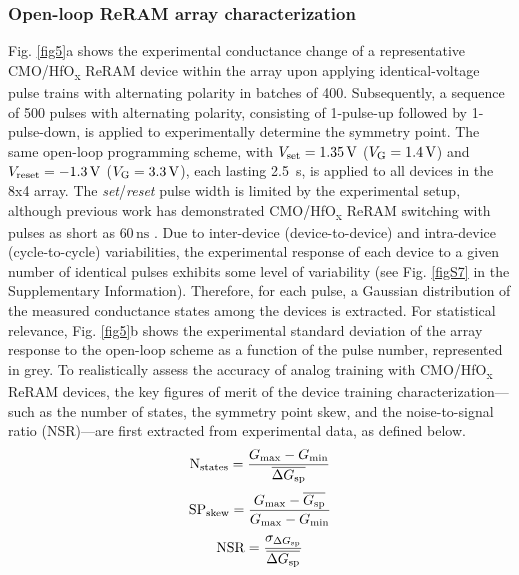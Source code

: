 \subsubsection{Open-loop ReRAM array characterization}\label{openloop_characterization}
Fig. \ref{fig5}a shows the experimental conductance change of a representative CMO/HfO\textsubscript{x} ReRAM device within the array upon applying identical-voltage pulse trains with alternating polarity in batches of 400. Subsequently, a sequence of 500 pulses with alternating polarity, consisting of 1-pulse-up followed by 1-pulse-down, is applied to experimentally determine the symmetry point.
The same open-loop programming scheme, with \(V_{\rm set} = 1.35 \, \mathrm{V}\) (\(V_{\rm G} = 1.4 \, \mathrm{V}\)) and \(V_{\rm reset} = -1.3 \, \mathrm{V}\) (\(V_{\rm G} = 3.3 \, \mathrm{V}\)), each lasting 2.5~\textmu s, is applied to all devices in the 8x4 array. The \textit{set}/\textit{reset} pulse width is limited by the experimental setup, although previous work has demonstrated CMO/HfO\textsubscript{\textnormal{x}} ReRAM switching with pulses as short as \(60 \, \mathrm{ns}\) \cite{Davide_DRC}. Due to inter-device (device-to-device) and intra-device (cycle-to-cycle) variabilities, the experimental response of each device to a given number of identical pulses exhibits some level of variability (see Fig. \ref{figS7} in the Supplementary Information). Therefore, for each pulse, a Gaussian distribution of the measured conductance states among the devices is extracted. For statistical relevance, Fig. \ref{fig5}b shows the experimental standard deviation of the array response to the open-loop scheme as a function of the pulse number, represented in grey. To realistically assess the accuracy of analog training with CMO/HfO\textsubscript{x} ReRAM devices, the key figures of merit of the device training characterization—such as the number of states, the symmetry point skew, and the noise-to-signal ratio (NSR)—are first extracted from experimental data, as defined below.%
\begin{align}
   \mathrm{N}_{\rm states} = \frac{G_{\rm max} - G_{\rm min}}{\overline{\Delta G_{\rm sp}}}
   \label{nstates}
\end{align}
\begin{align}
   \mathrm{SP}_{\rm skew} = \frac{G_{\rm max} - \overline{G_{\rm sp}}}{G_{\rm max} - G_{\rm min}}
   \label{skew}
\end{align}
\begin{align}
   \mathrm{NSR} = \frac{ \sigma_{\Delta G_{\rm sp}}  } {\overline{\Delta G_{\rm sp}}}
   \label{NSR}
\end{align}
